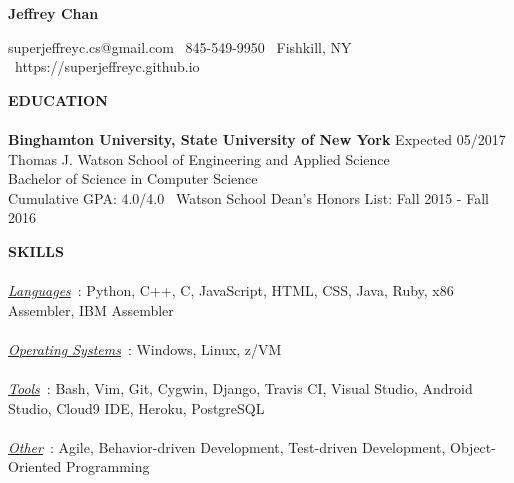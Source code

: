 \documentclass[10.5pt]{res}
\newcommand{\sectionSpace}{\vspace{-3.5pt}}
\begin{document}
 

\centerline{\LARGE \textbf{Jeffrey Chan}}
{\vspace{1pt}}
\centerline{superjeffreyc.cs@gmail.com \textbar ~845-549-9950 \textbar ~Fishkill, NY \textbar ~https://superjeffreyc.github.io}      
\vspace{-16pt}              
\begin{resume}                   
\textbf{EDUCATION} \\ [-10.5pt]
\noindent\makebox[\linewidth]{\rule{\textwidth}{0.4pt}}\\
\textbf{Binghamton University, State University of New York} \hfill Expected 05/2017 \\
    	Thomas J. Watson School of Engineering and Applied Science \\
	Bachelor of Science in Computer Science \\
	Cumulative GPA: 4.0/4.0 \textbar~Watson School Dean's Honors List: Fall 2015 - Fall 2016 
	\sectionSpace

\textbf{SKILLS} \\ [-10.5pt]
\noindent\makebox[\linewidth]{\rule{\textwidth}{0.4pt}}\\
\underline{\it Languages}~: Python, C++, C, JavaScript, HTML, CSS, Java, Ruby, x86 Assembler, IBM Assembler \\
{\vspace{-10.5pt}} \\
\underline{\it Operating Systems}~: Windows, Linux, z/VM \\
{\vspace{-10.5pt}} \\
\underline{\it Tools}~: Bash, Vim, Git, Cygwin, Django, Travis CI, Visual Studio, Android Studio, Cloud9 IDE, Heroku, PostgreSQL \\
{\vspace{-10.5pt}} \\
\underline{\it Other}~: Agile, Behavior-driven Development, Test-driven Development, Object-Oriented Programming
\sectionSpace


\end{resume}
\end{document}
